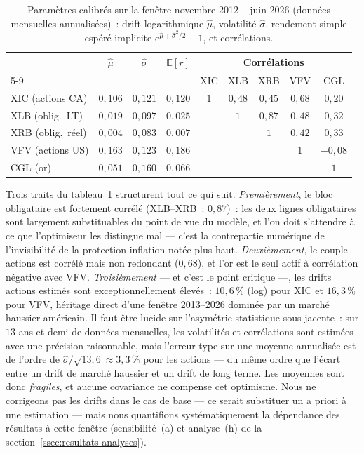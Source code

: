 \documentclass[11pt,letterpaper]{article}
\newcommand{\E}{\mathbb{E}}
\theoremstyle{definition}
\begin{document}
\begin{table}[htbp]
\centering
\caption{Paramètres calibrés sur la fenêtre novembre 2012 -- juin 2026
(données mensuelles annualisées)~: drift logarithmique $\hat\mu$, volatilité
$\hat\sigma$, rendement simple espéré implicite
$\mathrm e^{\hat\mu + \hat\sigma^2/2} - 1$, et corrélations.}
\label{tab:calib}
\small
\setlength{\tabcolsep}{4.5pt}
\begin{tabular}{lccc ccccc}
\toprule
& $\hat\mu$ & $\hat\sigma$ & $\E[r]$ & \multicolumn{5}{c}{Corrélations} \\
\cmidrule(lr){5-9}
& & & & XIC & XLB & XRB & VFV & CGL \\
\midrule
XIC (actions CA)   & $0{,}106$ & $0{,}121$ & $0{,}120$ & $1$ & $0{,}48$ & $0{,}45$ & $0{,}68$ & $0{,}20$ \\
XLB (oblig.\ LT)   & $0{,}019$ & $0{,}097$ & $0{,}025$ & & $1$ & $0{,}87$ & $0{,}48$ & $0{,}32$ \\
XRB (oblig.\ réel) & $0{,}004$ & $0{,}083$ & $0{,}007$ & & & $1$ & $0{,}42$ & $0{,}33$ \\
VFV (actions US)   & $0{,}163$ & $0{,}123$ & $0{,}186$ & & & & $1$ & $-0{,}08$ \\
CGL (or)           & $0{,}051$ & $0{,}160$ & $0{,}066$ & & & & & $1$ \\
\bottomrule
\end{tabular}
\end{table}

Trois traits du tableau~\ref{tab:calib} structurent tout ce qui suit.
\emph{Premièrement}, le bloc obligataire est fortement corrélé
(XLB--XRB~: $0{,}87$)~: les deux lignes obligataires sont largement
substituables du point de vue du modèle, et l'on doit s'attendre à ce que
l'optimiseur les distingue mal --- c'est la contrepartie numérique de
l'invisibilité de la protection inflation notée plus haut.
\emph{Deuxièmement}, le couple actions est corrélé mais non redondant
($0{,}68$), et l'or est le seul actif à corrélation négative avec VFV.
\emph{Troisièmement} --- et c'est le point critique ---, les drifts actions
estimés sont exceptionnellement élevés~: $10{,}6\,\%$ (log) pour XIC et
$16{,}3\,\%$ pour VFV, héritage direct d'une fenêtre 2013--2026 dominée par un
marché haussier américain. Il faut être lucide sur l'asymétrie statistique
sous-jacente~: sur $13$ ans et demi de données mensuelles, les volatilités et
corrélations sont estimées avec une précision raisonnable, mais l'erreur type
sur une moyenne annualisée est de l'ordre de
$\hat\sigma/\sqrt{13{,}6} \approx 3{,}3\,\%$ pour les actions --- du même ordre
que l'écart entre un drift de marché haussier et un drift de long terme. Les
moyennes sont donc \emph{fragiles}, et aucune covariance ne compense cet
optimisme. Nous ne corrigeons pas les drifts dans le cas de base --- ce serait
substituer un a priori à une estimation --- mais nous quantifions
systématiquement la dépendance des résultats à cette fenêtre
(sensibilité~(a) et analyse~(h) de la section~\ref{ssec:resultats-analyses}).
\end{document}
